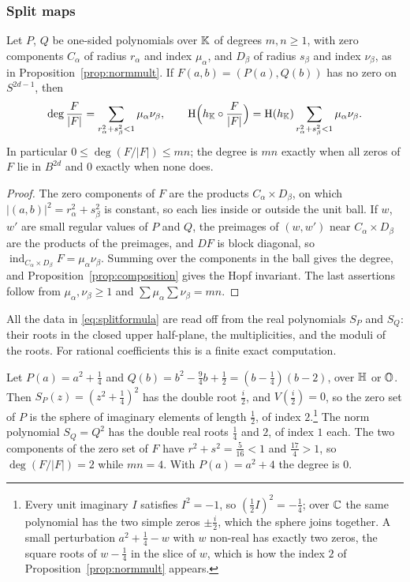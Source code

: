 \subsubsection{Split maps}

\begin{theorem}\label{thm:split}
Let $P$, $Q$ be one-sided polynomials over $\mathbb{K}$ of degrees $m,n\ge1$, with zero components $C_\alpha$ of radius $r_\alpha$ and index $\mu_\alpha$, and $D_\beta$ of radius $s_\beta$ and index $\nu_\beta$, as in Proposition~\ref{prop:normmult}. If $F(a,b)=(P(a),Q(b))$ has no zero on $S^{2d-1}$, then
\begin{equation}\label{eq:splitformula}
\deg\frac F{|F|}=\sum_{r_\alpha^2+s_\beta^2<1}\mu_\alpha\nu_\beta,\qquad \mathrm{H}\Bigl(h_{\mathbb{K}}\circ\frac F{|F|}\Bigr)=\mathrm{H}(h_{\mathbb{K}})\sum_{r_\alpha^2+s_\beta^2<1}\mu_\alpha\nu_\beta .
\end{equation}
In particular $0\le\deg(F/|F|)\le mn$; the degree is $mn$ exactly when all zeros of $F$ lie in $B^{2d}$ and $0$ exactly when none does.
\end{theorem}

\begin{proof}
The zero components of $F$ are the products $C_\alpha\times D_\beta$, on which $|(a,b)|^2=r_\alpha^2+s_\beta^2$ is constant, so each lies inside or outside the unit ball. If $w$, $w'$ are small regular values of $P$ and $Q$, the preimages of $(w,w')$ near $C_\alpha\times D_\beta$ are the products of the preimages, and $DF$ is block diagonal, so $\operatorname{ind}_{C_\alpha\times D_\beta}F=\mu_\alpha\nu_\beta$. Summing over the components in the ball gives the degree, and Proposition~\ref{prop:composition} gives the Hopf invariant. The last assertions follow from $\mu_\alpha,\nu_\beta\ge1$ and $\sum\mu_\alpha\sum\nu_\beta=mn$.
\end{proof}

All the data in \eqref{eq:splitformula} are read off from the real polynomials $S_P$ and $S_Q$: their roots in the closed upper half-plane, the multiplicities, and the moduli of the roots. For rational coefficients this is a finite exact computation.

\begin{example}\label{ex:split}
Let $P(a)=a^2+\frac14$ and $Q(b)=b^2-\frac94b+\frac12=(b-\frac14)(b-2)$, over $\mathbb{H}$ or $\mathbb{O}$. Then $S_P(z)=(z^2+\frac14)^2$ has the double root $\frac i2$, and $V(\frac i2)=0$, so the zero set of $P$ is the sphere of imaginary elements of length $\frac12$, of index $2$.\footnote{Every unit imaginary $I$ satisfies $I^2=-1$, so $(\tfrac12I)^2=-\tfrac14$; over $\mathbb{C}$ the same polynomial has the two simple zeros $\pm\tfrac i2$, which the sphere joins together. A small perturbation $a^2+\tfrac14-w$ with $w$ non-real has exactly two zeros, the square roots of $w-\tfrac14$ in the slice of $w$, which is how the index $2$ of Proposition~\ref{prop:normmult} appears.} The norm polynomial $S_Q=Q^2$ has the double real roots $\frac14$ and $2$, of index $1$ each. The two components of the zero set of $F$ have $r^2+s^2=\frac5{16}<1$ and $\frac{17}4>1$, so $\deg(F/|F|)=2$ while $mn=4$. With $P(a)=a^2+4$ the degree is $0$.
\end{example}


